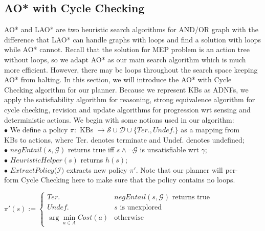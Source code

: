 \documentclass{llncs}
\begin{document}
\subsection{AO* with Cycle Checking}
AO* and LAO*\cite{Hansen2001LAO} are two heuristic search algorithms for AND/OR graph with the difference that LAO* can handle graphs with loops and find a solution with loops while AO* cannot. Recall that the solution for MEP problem is an action tree without loops, so we adapt AO* as our main search algorithm which is much more efficient. However, there may be loops throughout the search space keeping AO* from halting. In this section, we will introduce the AO* with Cycle Checking algorithm for our planner. Because we represent KBs as ADNFs, we apply the satisfiability algorithm for reasoning, strong equivalence algorithm for cycle checking, revision and update algorithms for progression wrt sensing and deterministic actions. We begin with some notions used in our algorithm:\\
\hspace*{0.1in}$\bullet$ We define a policy $\pi: $ KBs $\rightarrow \mathcal{S}\cup\mathcal{D}\cup\{Ter., Undef.\}$ as a mapping from\\
\hspace*{0.1in}\hspace{0.1in}  KBs to actions, where Ter. denotes terminate and Undef. denotes undefined;\\
\hspace*{0.1in}$\bullet$ $negEntail(s, \mathcal{G})$ returns true iff $s\land\lnot\mathcal{G}$ is unsatisfiable wrt $\gamma$;\\
\hspace*{0.1in}$\bullet$ $HeuristicHelper(s)$ returns $h(s)$;\\
\hspace*{0.1in}$\bullet$ $ExtractPolicy(\mathcal{I)}$ extracts new policy $\pi'$. Note that our planner will per-\\
\hspace*{0.1in}\hspace{0.1in} form Cycle Checking here to make sure that the policy contains no loops.\\
\centerline{
        $\pi'(s) := \begin{cases}
            Ter. &negEntail(s, \mathcal{G}) \text{ returns true}\\
            Undef. &s \text{ is unexplored}\\
            \arg\min\limits_{a\in A} Cost(a) &\text{otherwise}
        \end{cases}
        $}\\
\end{document}
